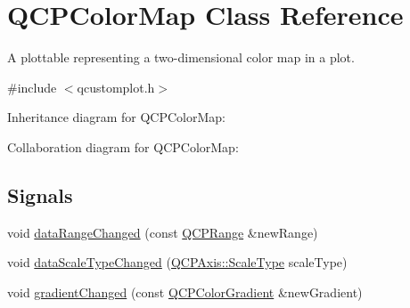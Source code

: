 \hypertarget{class_q_c_p_color_map}{}\section{Q\+C\+P\+Color\+Map Class Reference}
\label{class_q_c_p_color_map}


A plottable representing a two-\/dimensional color map in a plot.  




{\ttfamily \#include $<$qcustomplot.\+h$>$}



Inheritance diagram for Q\+C\+P\+Color\+Map\+:


Collaboration diagram for Q\+C\+P\+Color\+Map\+:
\subsection*{Signals}
\begin{DoxyCompactItemize}
\item 
void \hyperlink{class_q_c_p_color_map_a83ae5be3903da493f732e1a5c14fd807}{data\+Range\+Changed} (const \hyperlink{class_q_c_p_range}{Q\+C\+P\+Range} \&new\+Range)
\item 
void \hyperlink{class_q_c_p_color_map_a978d5d5c9f68cffef8c902b855c04490}{data\+Scale\+Type\+Changed} (\hyperlink{class_q_c_p_axis_a36d8e8658dbaa179bf2aeb973db2d6f0}{Q\+C\+P\+Axis\+::\+Scale\+Type} scale\+Type)
\item 
void \hyperlink{class_q_c_p_color_map_a31a12726736b1ac274e7b1d8dfb67468}{gradient\+Changed} (const \hyperlink{class_q_c_p_color_gradient}{Q\+C\+P\+Color\+Gradient} \&new\+Gradient)
\end{DoxyCompactItemize}

